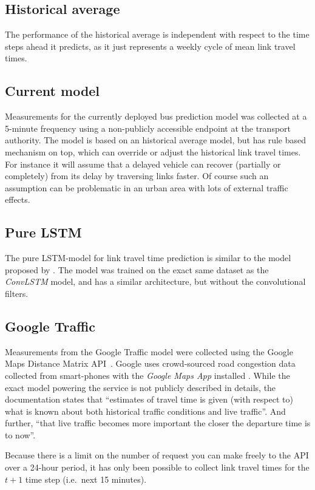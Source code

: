\documentclass[preprint,11pt,5p,twocolumn]{elsarticle}
\begin{document}
\subsection{Historical average}
The performance of the historical average is independent with respect to the time steps ahead it predicts, as it just represents a weekly cycle of mean link travel times.

\subsection{Current model}
Measurements for the currently deployed bus prediction model was collected at a 5-minute frequency using a non-publicly accessible endpoint at the transport authority. The model is based on an historical average model, but has rule based mechanism on top, which can override or adjust the historical link travel times. For instance it will assume that a delayed vehicle can recover (partially or completely) from its delay by traversing links faster. Of course such an assumption can be problematic in an urban area with lots of external traffic effects. 

\subsection{Pure LSTM}
The pure LSTM-model for link travel time prediction is similar to the model proposed by \citet{YanjieDuan2016}. The model was trained on the exact same dataset as the \emph{ConvLSTM} model, and has a similar architecture, but without the convolutional filters.
\newpage

\subsection{Google Traffic}
Measurements from the Google Traffic model were collected using the Google Maps Distance Matrix API~\citep{GMaps_DistanceMatrixAPI}. Google uses crowd-sourced road congestion data collected from smart-phones with the \emph{Google Maps App} installed \citep{GMaps_Crowdsourcing}. While the exact model powering the service is not publicly described in details, the documentation states that ``estimates of travel time is given (with respect to) what is known about both historical traffic conditions and live traffic''. And further, ``that live traffic becomes more important the closer the departure time is to now''.

Because there is a limit on the number of request you can make freely to the API over a 24-hour period, it has only been possible to collect link travel times for the $t + 1$ time step (i.e.\ next 15 minutes).
\end{document}
